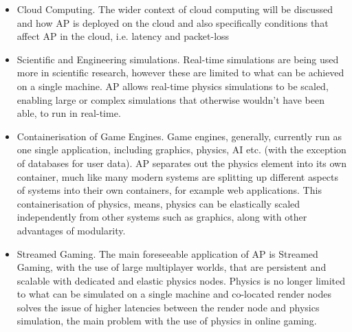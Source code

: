 \begin{itemize}
	\item Cloud Computing. The wider context of cloud computing will be discussed and how AP is deployed on the cloud and also specifically conditions that affect AP in the cloud, i.e. latency and packet-loss
	\item Scientific and Engineering simulations. Real-time simulations are being used more in scientific research, however these are limited to what can be achieved on a single machine. AP allows real-time physics simulations to be scaled, enabling large or complex simulations that otherwise wouldn't have been able, to run in real-time.
	\item Containerisation of Game Engines. Game engines, generally, currently run as one single application, including graphics, physics, AI etc. (with the exception of databases for user data). AP separates out the physics element into its own container, much like many modern systems are splitting up different aspects of systems into their own containers, for example web applications. This containerisation of physics, means, physics can be elastically scaled independently from other systems such as graphics, along with other advantages of modularity.
	\item Streamed Gaming. The main foreseeable application of AP is Streamed Gaming, with the use of large multiplayer worlds, that are persistent and scalable with dedicated and elastic physics nodes. Physics is no longer limited to what can be simulated on a single machine and co-located render nodes solves the issue of higher latencies between the render node and physics simulation, the main problem with the use of physics in online gaming.
\end{itemize}

